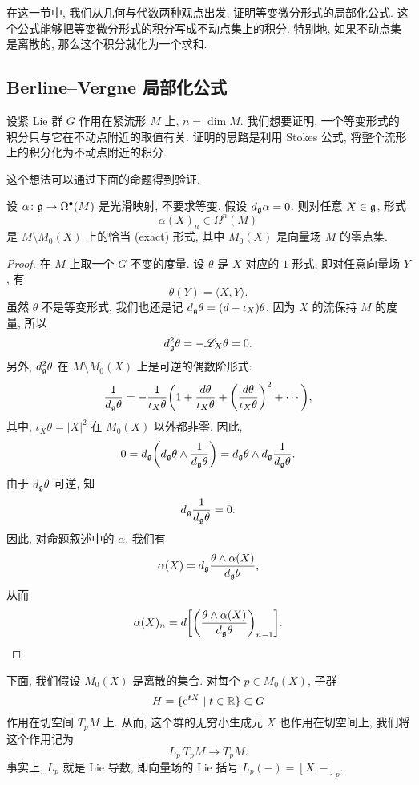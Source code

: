 在这一节中, 我们从几何与代数两种观点出发,
证明等变微分形式的局部化公式.
这个公式能够把等变微分形式的积分写成不动点集上的积分.
特别地, 如果不动点集是离散的, 那么这个积分就化为一个求和.


\subsection{Berline--Vergne 局部化公式}

设紧 Lie 群 $G$ 作用在紧流形 $M$ 上, $n = \dim M$.
我们想要证明, 一个等变形式的积分只与它在不动点附近的取值有关.
证明的思路是利用 Stokes 公式, 将整个流形上的积分化为不动点附近的积分.

这个想法可以通过下面的命题得到验证.

\begin{proposition} \label{thm-12-exact}
    设 $\alpha \colon \mathfrak{g} \to \Omega^\bullet (M)$ 是光滑映射, 不要求等变.
    假设 $d_{\mathfrak{g}} \alpha = 0$. 则对任意 $X \in \mathfrak{g}$, 形式
    \[ \alpha (X)_n \in \Omega^n (M) \]
    是 $M \setminus M_0 (X)$ 上的恰当 (exact) 形式,
    其中 $M_0 (X)$ 是向量场 $M$ 的零点集.
\end{proposition}

\begin{proof}
    在 $M$ 上取一个 $G$-不变的度量. 设 $\theta$ 是 $X$ 对应的 $1$-形式,
    即对任意向量场 $Y$, 有
    \[ \theta (Y) = \langle X, Y \rangle. \]
    虽然 $\theta$ 不是等变形式, 我们也还是记 $d_{\mathfrak{g}} \theta = (d - \iota_X) \theta$.
    因为 $X$ 的流保持 $M$ 的度量, 所以
    \[ d_{\mathfrak{g}}^2 \theta = - \mathscr{L}_X \theta = 0. \]
    另外, $d_{\mathfrak{g}}^2 \theta$ 在 $M \setminus M_0 (X)$ 上是可逆的偶数阶形式:
    \[ \frac {1} {d_{\mathfrak{g}} \theta} =
        - \frac {1} {\iota_X \theta} \biggl(
            1 + \frac {d \theta} {\iota_X \theta} + 
            \biggl( \frac {d \theta} {\iota_X \theta} \biggr)^2 + \cdots
        \biggr), \]
    其中, $\iota_X \theta = |X|^2$ 在 $M_0 (X)$ 以外都非零.
    因此,
    \[ 0 = d_{\mathfrak{g}} \biggl( d_{\mathfrak{g}} \theta \wedge \frac {1} {d_{\mathfrak{g}} \theta} \biggr)
        = d_{\mathfrak{g}} \theta \wedge d_{\mathfrak{g}} \frac {1} {d_{\mathfrak{g}} \theta}. \]
    由于 $d_{\mathfrak{g}} \theta$ 可逆, 知
    \[ d_{\mathfrak{g}} \frac {1} {d_{\mathfrak{g}} \theta} = 0. \]
    因此, 对命题叙述中的 $\alpha$, 我们有
    \[ \alpha (X) = d_{\mathfrak{g}} \frac {\theta \wedge \alpha (X)} {d_{\mathfrak{g}} \theta}, \]
    从而
    \[ \alpha (X)_n = d \biggl[ \biggl( 
        \frac {\theta \wedge \alpha (X)} {d_{\mathfrak{g}} \theta}
        \biggr)_{n-1} \biggr]. \qedhere \]
\end{proof}

下面, 我们假设 $M_0 (X)$ 是离散的集合.
对每个 $p \in M_0 (X)$, 子群
\[ H = \{ \mathrm{e}^{tX} \mid t \in \mathbb{R} \} \subset G \]
作用在切空间 $T_p M$ 上. 从而, 这个群的无穷小生成元 $X$ 也作用在切空间上,
我们将这个作用记为
\[ L_p \: T_p M \to T_p M. \]
事实上, $L_p$ 就是 Lie 导数, 即向量场的 Lie 括号 $L_p(-) = [X, -]_p$.

